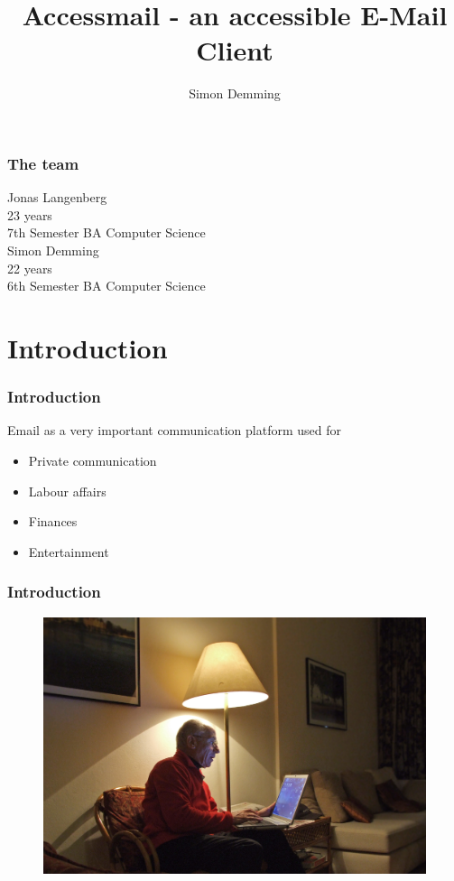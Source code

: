 \documentclass[9pt]{beamer}
\title{Accessmail - an accessible E-Mail Client}
\author{Simon Demming}
\institute[Department]{\par\smallskip\smallskip Department for Rehabilitation\\ Department for Computer Science}
\begin{document}
	\begin{frame}
		\setcounter{framenumber}{0}
	    \titlepage
	\end{frame}
	
	\begin{frame}
	    \frametitle{The team}
	    Jonas Langenberg \\
	    23 years\\
	    7th Semester BA Computer Science\\
	    Simon Demming\\
	    22 years\\
	    6th Semester BA Computer Science\\
	    
	\end{frame}
	
	\section{Introduction}
		
		\begin{frame}
			\frametitle{Introduction}
			
			Email as a very important communication platform used for
			\begin{itemize}
				\item Private communication
				\item Labour affairs
				\item Finances
				\item Entertainment
			\end{itemize}
		\end{frame}
		
		\begin{frame}
			\frametitle{Introduction}
			\begin{figure}
				\centering
				\includegraphics[scale=0.1]{Images/computersenior.jpg}
			\end{figure}
		\end{frame}
		
\end{document}

